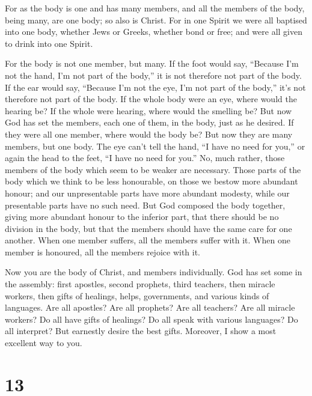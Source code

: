  For as the body is one and has many members, and all the
members of the body, being many, are one body; so also is Christ.
 For in one Spirit we were all baptised into one body,
whether Jews or Greeks, whether bond or free; and were all given to
drink into one Spirit.

 For the body is not one member, but many.  If
the foot would say, ``Because I'm not the hand, I'm not part of the
body,'' it is not therefore not part of the body.  If the
ear would say, ``Because I'm not the eye, I'm not part of the body,''
it's not therefore not part of the body.  If the whole body
were an eye, where would the hearing be? If the whole were hearing,
where would the smelling be?  But now God has set the
members, each one of them, in the body, just as he desired.
 If they were all one member, where would the body be?
 But now they are many members, but one body. 
The eye can't tell the hand, ``I have no need for you,'' or again the
head to the feet, ``I have no need for you.''  No, much
rather, those members of the body which seem to be weaker are necessary.
 Those parts of the body which we think to be less
honourable, on those we bestow more abundant honour; and our
unpresentable parts have more abundant modesty,  while our
presentable parts have no such need. But God composed the body together,
giving more abundant honour to the inferior part,  that
there should be no division in the body, but that the members should
have the same care for one another.  When one member
suffers, all the members suffer with it. When one member is honoured,
all the members rejoice with it.

 Now you are the body of Christ, and members individually.
 God has set some in the assembly: first apostles, second
prophets, third teachers, then miracle workers, then gifts of healings,
helps, governments, and various kinds of languages.  Are
all apostles? Are all prophets? Are all teachers? Are all miracle
workers?  Do all have gifts of healings? Do all speak with
various languages? Do all interpret?  But earnestly desire
the best gifts. Moreover, I show a most excellent way to you.

\hypertarget{section-12}{%
\section{13}\label{section-12}}


